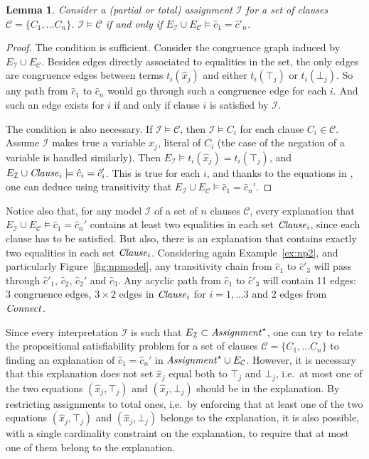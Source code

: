 \documentclass{easychair}
\newtheorem{lemma}{Lemma}
\begin{document}
\begin{lemma}
\label{lemma:eqv}
Consider a (partial or total) assignment $\mathcal{I}$ for a set of clauses
$\mathcal{C}= \{C_1, \dots C_n\}$.  $\mathcal{I} \models \mathcal{C}$ if and only if
$E_{\mathcal{I}} \cup E_\mathcal{C} \models \hat{c}_1 = \hat{c}'_n$.
\end{lemma}
\begin{proof}
The condition is sufficient.  Consider the congruence graph induced by
$E_{\mathcal{I}} \cup E_\mathcal{C}$.  Besides edges directly associated to
equalities in the set, the only edges are congruence edges between terms
$t_i(\hat{x}_j)$ and either $t_i(\top_j)$ or $t_i(\bot_j)$.  So any path from
$\hat{c}_1$ to $\hat{c}_n$ would go through such a congruence edge for each $i$.
And such an edge exists for $i$ if and only if clause $i$ is satisfied by
$\mathcal{I}$.

The condition is also necessary.  If $\mathcal{I} \models \mathcal{C}$, then
$\mathcal{I} \models C_i$ for each clause $C_i \in \mathcal{C}$.  Assume
$\mathcal{I}$ makes true a variable $x_j$, literal of $C_i$ (the case of
the negation of a variable is handled similarly).  Then $E_{\mathcal{I}} \models
t_i(\hat{x}_j) = t_i(\top_j)$, and $E_{\mathcal{I}} \cup {\it Clause}_i
\models \hat{c}_i = \hat{c}_i'$.  This is true for each $i$, and
thanks to the equations in \Connect, one can deduce using transitivity that
$E_{\mathcal{I}} \cup E_\mathcal{C} \models \hat{c}_1 = \hat{c}_n'$.
\end{proof}

\noindent Notice also that, for any model $\mathcal{I}$ of a set of $n$ clauses
$\mathcal{C}$, every explanation that $E_{\mathcal{I}} \cup E_\mathcal{C}
\models \hat{c}_1 = \hat{c}_n'$ contains at least two equalities in
each set ${\it Clause}_i$, since each clause has to be satisfied.  But also, there is
an explanation that contains exactly two equalities in each set ${\it Clause}_i$.
Considering again Example~\ref{ex:np2}, and particularly
Figure~\ref{fig:npmodel}, any transitivity chain from $\hat{c}_1$ to
$\hat{c}'_3$ will pass through $\hat{c}'_1$, $\hat{c}_2$, $\hat{c}_2'$ and
$\hat{c}_3$.  Any acyclic path from $\hat{c}_1$ to $\hat{c}'_3$ will contain 11
edges: 3 congruence edges, $3\times 2$ edges in ${\it Clause}_i$ for $i=1,\dots 3$
and 2 edges from ${\it Connect}$.

Since every interpretation $\mathcal{I}$ is such that $E_{\mathcal{I}} \subset
{\it Assignment}^\star$, one can try to relate the propositional satisfiability
problem for a set of clauses $\mathcal{C}= \{C_1, \dots C_n\}$ to finding an
explanation of $\hat{c}_1 = \hat{c}_n'$ in ${\it Assignment}^\star \cup
E_{\mathcal{C}}$.  However, it is necessary that this explanation does not set
$\hat{x}_j$ equal both to $\top_j$ and $\bot_j$, i.e.\ at most one of the two
equations $(\hat{x}_j,\top_j)$ and $(\hat{x}_j,\bot_j)$ should be in the
explanation.  By restricting assignments to total ones, i.e.\ by enforcing that
at least one of the two equations $(\hat{x}_j,\top_j)$ and $(\hat{x}_j,\bot_j)$
belongs to the explanation, it is also possible, with a single cardinality
constraint on the explanation, to require that at most one of them belong to the
explanation.
\end{document}
